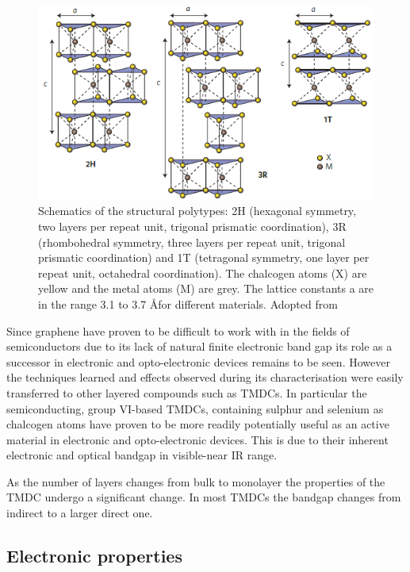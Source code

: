 	\begin{figure}[h]
	\begin{center}
	\includegraphics[scale=0.7]{TMDCPolytypes.png}
	\caption{Schematics of the structural polytypes: 2H (hexagonal symmetry, two layers per repeat unit, trigonal prismatic coordination), 3R (rhombohedral symmetry, three layers per repeat unit, trigonal prismatic coordination) and 1T (tetragonal symmetry, one layer per repeat unit, octahedral coordination). The chalcogen atoms (X) are yellow and the metal atoms (M) are grey. The lattice constants a are in the range 3.1 to 3.7 \AA for different materials. Adopted from \cite{ElectronicsAndOptoelectronicsOfTwo-dimensionalTransitionMetalDichalcogenides}}
	\label{fig:TMDCPolytypes}
	\end{center}
	\end{figure}
	
	Since graphene have proven to be difficult to work with in the fields of semiconductors due to its lack of natural finite electronic band gap its role as a successor in electronic and opto-electronic devices remains to be seen. However the techniques learned and effects observed during its characterisation were easily transferred to other layered compounds such as TMDCs. In particular the semiconducting, group VI-based TMDCs, containing sulphur and selenium as chalcogen atoms have proven to be more readily potentially useful as an active material in electronic and opto-electronic devices. This is due to their inherent electronic and optical bandgap in visible-near IR range. 
	
	As the number of layers changes from bulk to monolayer the properties of the TMDC undergo a significant change. In most TMDCs the bandgap changes from indirect to a larger direct one. 
	
\subsection{Electronic properties}
	\label{subsec:Electronic properties}
	
